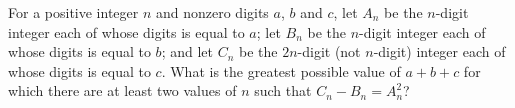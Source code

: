 For a positive integer $n$ and nonzero digits $a$, $b$ and $c$, let $A_n$ be the $n$-digit integer each of whose digits is equal to $a$; let $B_n$ be the $n$-digit integer each of whose digits is equal to $b$; and let $C_n$ be the $2n$-digit (not $n$-digit) integer each of whose digits is equal to $c$. What is the greatest possible value of $a+b+c$ for which there are at least two values of $n$ such that $C_n-B_n=A_n^2$?
